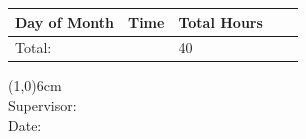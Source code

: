 \documentclass{article}
\begin{document}
\vspace{1mm}
\begin{table}[htbp]
\begin{tabular}{ | C{2cm}| C{1.75cm} | C{1cm} |  L{12.5cm} | N}
\hline
Day of Month & Time & Total Hours & & \\ \hline

Total: & & 40 & \\ \hline
\end{tabular}
\label{tab:table}
\end{table}

\vspace{2cm}
\noindent \line(1,0){6cm} \\
Supervisor: \\
Date:
\end{document}
